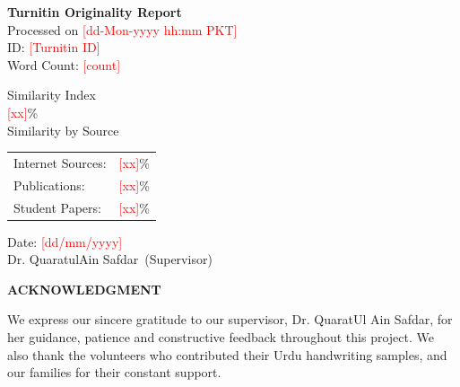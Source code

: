 \documentclass[12pt,a4paper]{report}
\newcommand{\projecttitle}{Urdu-Ink Mobile: A GAN-Enhanced Real-Time Handwriting Recognition Keyboard}
\newcommand{\studentA}{Waqar Ahmad}
\newcommand{\studentB}{Isna Jadoon}
\newcommand{\supervisorname}{Dr. QuaratulAin Safdar}
\newcommand{\todo}[1]{\textcolor{red}{[#1]}}
\newcommand{\frontheading}[1]{%
  \begin{center}\bfseries\fontsize{16}{20}\selectfont\MakeUppercase{#1}\end{center}\vspace{8pt}}
\begin{document}
\vspace{16pt}
\noindent\textbf{Turnitin Originality Report}\\
Processed on \todo{dd-Mon-yyyy hh:mm PKT}\\
ID: \todo{Turnitin ID}\\
Word Count: \todo{count}

\vspace{10pt}
\noindent Similarity Index\\
\todo{xx}\%\\[6pt]
Similarity by Source\\
\begin{tabular}{@{}l l@{}}
Internet Sources: & \hspace{1.2in}\todo{xx}\%\\
Publications: & \hspace{1.2in}\todo{xx}\%\\
Student Papers: & \hspace{1.2in}\todo{xx}\%\\
\end{tabular}

\vspace{60pt}
\noindent Date: \todo{dd/mm/yyyy} \hfill \underline{\hspace{2.2in}}\\
\hspace*{\fill}\supervisorname\ (Supervisor)
\clearpage


\frontheading{Acknowledgment}
We express our sincere gratitude to our supervisor, Dr. QuaratUl Ain Safdar, for her guidance, patience and constructive feedback throughout this project. We also thank the volunteers who contributed their Urdu handwriting samples, and our families for their constant support.
\clearpage
\end{document}
